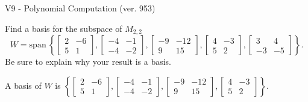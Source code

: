 \begin{exercise}
  \begin{exerciseTitle}V9 - Polynomial Computation (ver. 953)\end{exerciseTitle}
  \begin{exerciseStatement}
    Find a basis for the subspace of \(M_{2,2}\) 
\[W=\mathrm{span}\ \left\{\left[\begin{array}{cc}
2 & -6 \\
5 & 1
\end{array}\right] , \left[\begin{array}{cc}
-4 & -1 \\
-4 & -2
\end{array}\right] , \left[\begin{array}{cc}
-9 & -12 \\
9 & 15
\end{array}\right] , \left[\begin{array}{cc}
4 & -3 \\
5 & 2
\end{array}\right] , \left[\begin{array}{cc}
3 & 4 \\
-3 & -5
\end{array}\right]\right\}.\]
 Be sure to explain why your result is a basis.


  \end{exerciseStatement}
  \begin{exerciseAnswer}
   A basis of \(W\) is  \(\left\{\left[\begin{array}{cc}
2 & -6 \\
5 & 1
\end{array}\right] , \left[\begin{array}{cc}
-4 & -1 \\
-4 & -2
\end{array}\right] , \left[\begin{array}{cc}
-9 & -12 \\
9 & 15
\end{array}\right] , \left[\begin{array}{cc}
4 & -3 \\
5 & 2
\end{array}\right]\right\}\).
  


  \end{exerciseAnswer}
\end{exercise}